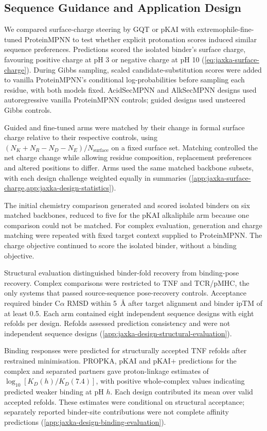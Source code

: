 \subsection{Sequence Guidance and Application Design}
\label{sec:jaxka-sequence-sampling}

We compared surface-charge steering by GQT or pKAI with extremophile-fine-tuned ProteinMPNN to test whether explicit protonation scores induced similar sequence preferences. Predictions scored the isolated binder's surface charge, favouring positive charge at pH 3 or negative charge at pH 10 (\cref{eq:jaxka-surface-charge}). During Gibbs sampling, scaled candidate-substitution scores were added to vanilla ProteinMPNN's conditional log-probabilities before sampling each residue, with both models fixed. AcidSecMPNN and AlkSecMPNN designs used autoregressive vanilla ProteinMPNN controls; guided designs used unsteered Gibbs controls.

Guided and fine-tuned arms were matched by their change in formal surface charge relative to their respective controls, using $(N_K+N_R-N_D-N_E)/N_{\mathrm{surface}}$ on a fixed surface set. Matching controlled the net charge change while allowing residue composition, replacement preferences and altered positions to differ. Arms used the same matched backbone subsets, with each design challenge weighted equally in summaries (\cref{app:jaxka-surface-charge,app:jaxka-design-statistics}).

The initial chemistry comparison generated and scored isolated binders on six matched backbones, reduced to five for the pKAI alkaliphile arm because one comparison could not be matched. For complex evaluation, generation and charge matching were repeated with fixed target context supplied to ProteinMPNN. The charge objective continued to score the isolated binder, without a binding objective.

Structural evaluation distinguished binder-fold recovery from binding-pose recovery. Complex comparisons were restricted to TNF and TCR/pMHC, the only systems that passed source-sequence pose-recovery controls. Acceptance required binder C$\alpha$ RMSD within 5~\AA{} after target alignment and binder ipTM of at least 0.5. Each arm contained eight independent sequence designs with eight refolds per design. Refolds assessed prediction consistency and were not independent sequence designs (\cref{app:jaxka-design-structural-evaluation}).

Binding responses were predicted for structurally accepted TNF refolds after restrained minimisation. PROPKA, pKAI and pKAI+ predictions for the complex and separated partners gave proton-linkage estimates of $\log_{10}[K_D(h)/K_D(7.4)]$, with positive whole-complex values indicating predicted weaker binding at pH $h$. Each design contributed its mean over valid accepted refolds. These estimates were conditional on structural acceptance; separately reported binder-site contributions were not complete affinity predictions (\cref{app:jaxka-design-binding-evaluation}).

